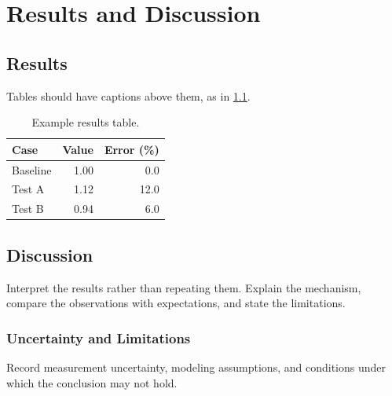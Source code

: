 \chapter{Results and Discussion}
\label{chap:results}

\section{Results}

Tables should have captions above them, as in \cref{tab:sample}.

\begin{table}[htbp]
  \centering
  \caption{Example results table.}
  \label{tab:sample}
  \begin{tabular}{lrr}
    \toprule
    {Case} & {Value} & {Error (\%)} \\
    \midrule
    Baseline & 1.00 & 0.0 \\
    Test A   & 1.12 & 12.0 \\
    Test B   & 0.94 & 6.0 \\
    \bottomrule
  \end{tabular}
\end{table}

\section{Discussion}

Interpret the results rather than repeating them. Explain the mechanism,
compare the observations with expectations, and state the limitations.

\subsection{Uncertainty and Limitations}

Record measurement uncertainty, modeling assumptions, and conditions under
which the conclusion may not hold.
